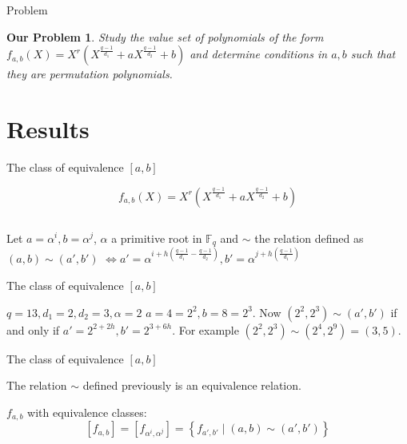 \documentclass{beamer}
\newtheorem{ourproblem}{Our Problem}
\begin{document}
\begin{frame}{Problem}
  \begin{ourproblem}
    Study the value set of polynomials of the form $f_{a,b}(X) = X^r(X^{\frac{q-1}{d_1}} + aX^{\frac{q-1}{d_2}} +b)$ and determine conditions in $a,b$ such that they are permutation polynomials.
  \end{ourproblem}
\end{frame}

\section{Results} %
\label{sec:results}


\begin{frame}{The class of equivalence $[a,b]$}
  
  {\Large $$f_{a,b}(X) = X^r(X^{\frac{q-1}{d_1}} + aX^{\frac{q-1}{d_2}} +b)$$}

  $$$$

  Let $a = \alpha^i, b = \alpha^j$, $\alpha$ a primitive root in $\mathbb{F}_q$ and $\sim$ the relation defined as $(a,b) \sim (a', b')$ 
  $\Longleftrightarrow a' = \alpha^{i+h(\frac{q-1}{d_1} - \frac{q-1}{d_2})}, b' = \alpha^{j+h(\frac{q-1}{d_1})}$

\end{frame}

\begin{frame}{The class of equivalence $[a,b]$}

  \begin{example}
    $q = 13, d_1 = 2, d_2 = 3, \alpha = 2$
    \linebreak
    \pause
    $a = 4 = 2^2, b = 8 = 2^3$.
    \linebreak
    Now $(2^2,2^3) \sim (a',b')$ if and only if
    $a' = 2^{2+2h}, b' = 2^{3+6h}$.
    \linebreak
    For example $(2^2,2^3) \sim (2^4,2^9) = (3,5)$.
  \end{example}

\end{frame}

\begin{frame}{The class of equivalence $[a,b]$}
  
  \begin{lemma}
    The relation $\sim$ defined previously is an equivalence relation.
  \end{lemma}

  $f_{a,b}$ with equivalence classes:
  $$ [f_{a,b}] = [f_{\alpha^i, \alpha^j}] = \left\{ f_{a',b'} \mid (a,b) \sim (a',b') \right\} $$

\end{frame}
\end{document}
